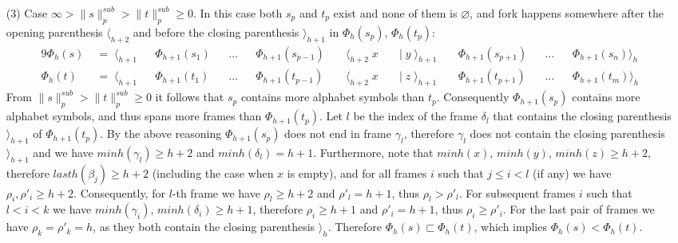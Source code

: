 \documentclass[AMA,STIX1COL]{WileyNJD-v2}
\newcommand{\Xl}{\langle}
\newcommand{\Xr}{\rangle}
\newcommand{\snorm}[2]{\|{#1}\|^{sub}_{#2}}
\begin{document}
\begin{proofEnd}
\begin{itemize}[itemsep=0.5em, topsep=0.5em]
    \item[(3)]
        Case $\infty > \snorm{s}{p} > \snorm{t}{p} \geq 0$.
        In this case both $s_p$ and $t_p$ exist and none of them is $\varnothing$,
        and fork happens somewhere after the opening parenthesis $\Xl_{h+2}$
        and before the closing parenthesis $\Xr_{h+1}$ in $\Phi_{h}(s_p)$, $\Phi_{h}(t_p)$:
        \begin{alignat*}{9}
            \Phi_{h}(s) &\;=\; \Xl_{h+1} &&\Phi_{h+1}(s_1) &&\dots &&\Phi_{h+1}(s_{p-1}) &&\; \Xl_{h+2} \; x
                &&\;\big|\; y \; \Xr_{h+1} \; &&\Phi_{h+1}(s_{p+1}) &&\dots &&\Phi_{h+1}(s_n) \Xr_{h} \\[-0.5em]
            \Phi_{h}(t) &\;=\; \Xl_{h+1} &&\Phi_{h+1}(t_1) &&\dots &&\Phi_{h+1}(t_{p-1}) &&\; \Xl_{h+2} \; x
                &&\;\big|\; z \; \Xr_{h+1} \; &&\Phi_{h+1}(t_{p+1}) &&\dots &&\Phi_{h+1}(t_m) \Xr_{h}
        \end{alignat*}
        From $\snorm{s}{p} > \snorm{t}{p} \geq 0$ it follows that
        $s_p$ contains more alphabet symbols than $t_p$.
        Consequently $\Phi_{h+1}(s_p)$ contains more alphabet symbols, and thus spans more frames than $\Phi_{h+1}(t_p)$.
        Let $l$ be the index of the frame $\delta_l$ that contains the closing parenthesis $\Xr_{h+1}$ of $\Phi_{h+1}(t_p)$.
        By the above reasoning $\Phi_{h+1}(s_p)$ does not end in frame $\gamma_l$,
        therefore $\gamma_l$ does not contain the closing parenthesis $\Xr_{h+1}$
        and we have $minh (\gamma_l) \geq h+2$ and $minh (\delta_l) = h+1$.
        Furthermore, note that $minh(x)$, $minh(y)$, $minh(z) \geq h + 2$,
        therefore $lasth(\beta_j) \geq h+2$ (including the case when $x$ is empty),
        and for all frames $i$ such that $j \leq i < l$ (if any) we have $\rho_i, \rho'_i \geq h+2$.
        Consequently, for $l$-th frame we have $\rho_l \geq h+2$ and $\rho'_l = h + 1$, thus $\rho_l > \rho'_l$.
        For subsequent frames $i$ such that $l < i < k$ we have $minh(\gamma_i)$, $minh(\delta_i) \geq h + 1$,
        therefore $\rho_i \geq h+1$ and $\rho'_i = h + 1$, thus $\rho_i \geq \rho'_i$.
        For the last pair of frames we have $\rho_k = \rho'_k = h$, as they both contain the closing parenthesis $\Xr_{h}$.
        Therefore $\Phi_{h}(s) \sqsubset \Phi_{h}(t)$,
        which implies $\Phi_{h}(s) < \Phi_{h}(t)$.
    \end{itemize}
\end{proofEnd}
\end{document}
